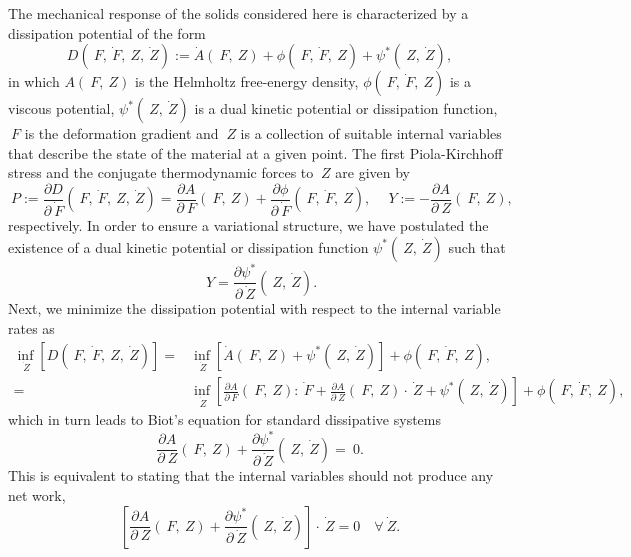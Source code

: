 \documentclass[12pt]{article}
\numberwithin{equation}{section}
\begin{document}
The mechanical response of the solids considered here is characterized
by a dissipation potential of the form
\begin{equation} \label{eq:power-density}
  D(~F, \dot{~F}, ~Z, \dot{~Z})
  :=
  \dot{A}(~F, ~Z)
  +
  \phi(~F, \dot{~F}, ~Z)
  +
  \psi^*(~Z, \dot{~Z}),
\end{equation}
in which $A(~F, ~Z)$ is the Helmholtz free-energy density,
$\phi(~F, \dot{~F}, ~Z)$ is a viscous potential, $\psi^*(~Z,
\dot{~Z})$ is a dual kinetic potential or dissipation function, $~F$
is the deformation gradient and $~Z$ is a collection of suitable
internal variables that describe the state of the material at a given
point. The first Piola-Kirchhoff stress and the conjugate
thermodynamic forces to $~Z$ are given by
\begin{equation} \label{eq:1PKstress-and-Y}
  ~P
  :=
  \frac{\partial D}{\partial \dot{~F}}(~F, \dot{~F}, ~Z, \dot{~Z})
  =
  \frac{\partial A}{\partial ~F}(~F, ~Z)
  +
  \frac{\partial \phi}{\partial \dot{~F}}(~F, \dot{~F}, ~Z),
  \quad
  ~Y := - \frac{\partial A}{\partial ~Z} (~F, ~Z),
\end{equation}
respectively. In order to ensure a variational structure, we have
postulated the existence of a dual kinetic potential or dissipation
function $\psi^*(~Z, \dot{~Z})$ such that
\begin{equation} \label{eq:dual-kinetic-potential}
  ~Y = \frac{\partial \psi^*}{\partial \dot{~Z}} (~Z, \dot{~Z}).
\end{equation}
Next, we minimize the dissipation potential 
with respect to the internal variable rates as
\begin{equation}
  \begin{split}
    \inf_{\dot{~Z}} [ D(~F, \dot{~F}, ~Z, \dot{~Z}) ]
    =
    &
    \inf_{\dot{~Z}}
    \left[
      \dot{A}(~F, ~Z)
      +
      \psi^*(~Z, \dot{~Z})
    \right] +
    \phi(~F, \dot{~F}, ~Z),
    \\
    =
    &
    \inf_{\dot{~Z}}
    \left[
      \frac{\partial A}{\partial ~F}(~F, ~Z) : \dot{~F}
      +
      \frac{\partial A}{\partial ~Z}(~F, ~Z) \cdot \dot{~Z}
      +
      \psi^*(~Z, \dot{~Z})
    \right] +
    \phi(~F, \dot{~F}, ~Z),
  \end{split}
\end{equation}
which in turn leads to Biot's equation for standard dissipative systems
\begin{equation} \label{eq:Biots-equation}
  \frac{\partial A}{\partial ~Z} (~F, ~Z)
  +
  \frac{\partial \psi^*}{\partial \dot{~Z}} (~Z, \dot{~Z})
  =
  ~0.
\end{equation}
This is equivalent to stating that the internal variables should not
produce any net work, \ie
\begin{equation} \label{eq:internal-no-work}
  \left[
    \frac{\partial A}{\partial ~Z} (~F, ~Z)
    +
    \frac{\partial \psi^*}{\partial \dot{~Z}} (~Z, \dot{~Z})
  \right]
  \cdot
   \dot{~Z}
  =
  0
  \quad
  \forall \dot{~Z}.
\end{equation}
\end{document}
